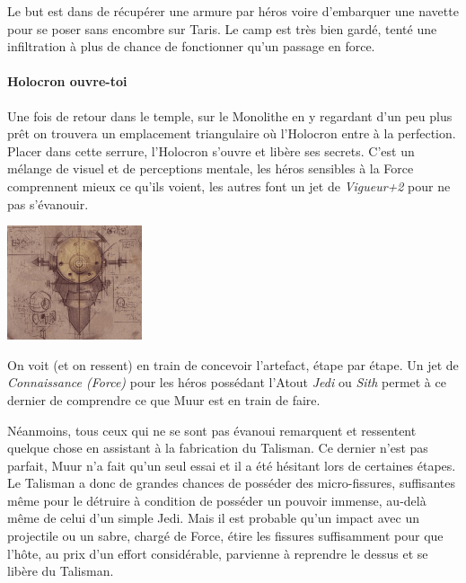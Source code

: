 Le but est dans de récupérer une armure par héros voire d’embarquer une navette pour se poser sans encombre sur Taris. Le camp est très bien gardé, tenté une infiltration à plus de chance de fonctionner qu’un passage en force.

\paragraph{Holocron ouvre-toi}
Une fois de retour dans le temple, sur le Monolithe en y regardant d’un peu plus prêt on trouvera un emplacement triangulaire où l’Holocron entre à la perfection. Placer dans cette serrure, l’Holocron s’ouvre et libère ses secrets. C’est un mélange de visuel et de perceptions mentale, les héros sensibles à la Force comprennent mieux ce qu’ils voient, les autres font un jet de \textit{Vigueur+2} pour ne pas s’évanouir.

\noindent\includegraphics[width=\linewidth]{_img/talisman-book.png}

On voit (et on ressent)  en train de concevoir l’artefact, étape par étape. Un jet de \textit{Connaissance (Force)} pour les héros possédant l’Atout \textit{Jedi} ou \textit{Sith} permet à ce dernier de comprendre ce que Muur est en train de faire.

Néanmoins, tous ceux qui ne se sont pas évanoui remarquent et ressentent quelque chose en assistant à la fabrication du Talisman. Ce dernier n’est pas parfait, Muur n’a fait qu’un seul essai et il a été hésitant lors de certaines étapes. Le Talisman a donc de grandes chances de posséder des micro-fissures, suffisantes même pour le détruire à condition de posséder un pouvoir immense, au-delà même de celui d’un simple Jedi. Mais il est probable qu’un impact avec un projectile ou un sabre, chargé de Force, étire les fissures suffisamment pour que l’hôte, au prix d’un effort considérable, parvienne à reprendre le dessus et se libère du Talisman.


